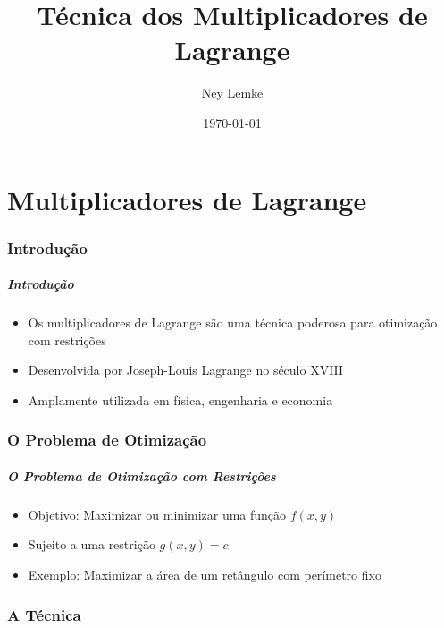 \documentclass[11pt]{beamer}
\title{Técnica dos Multiplicadores de Lagrange}
\author{Ney Lemke}
\institute[IBB-UNESP]{%
    Departamento de Biofísica e Farmacologia}
\date{\today}
\begin{document}
\frame{\titlepage}

\part{Multiplicadores de Lagrange}

\section{Introdução}

\begin{frame}
\frametitle{Introdução}
\begin{itemize}
    \item Os multiplicadores de Lagrange são uma técnica poderosa para otimização com restrições
    \item Desenvolvida por Joseph-Louis Lagrange no século XVIII
    \item Amplamente utilizada em física, engenharia e economia
\end{itemize}
\end{frame}

\section{O Problema de Otimização}

\begin{frame}
\frametitle{O Problema de Otimização com Restrições}
\begin{itemize}
    \item Objetivo: Maximizar ou minimizar uma função $f(x,y)$
    \item Sujeito a uma restrição $g(x,y) = c$
    \item Exemplo: Maximizar a área de um retângulo com perímetro fixo
\end{itemize}
\end{frame}

\section{A Técnica}
\end{document}

